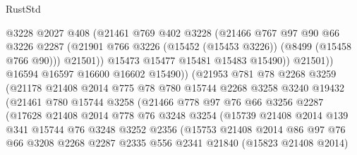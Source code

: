 \begin{lexlean}{RustStd}
\begin{coremodule}
                          @3228
                          @2027
                          @408
                          (@21461
                            @769
                            @402
                            @3228
                            (@21466
                              @767
                              @97
                              @90
                              @66
                              @3226
                              @2287
                              (@21901 @766 @3226 (@15452 (@15453 @3226)) (@8499 (@15458 @766 @90)))
                              @21501))
                          @15473
                          @15477
                          @15481
                          @15483
                          @15490))
                      @21501))
                  @16594
                  @16597
                  @16600
                  @16602
                  @15490))
              (@21953
                @781
                @78
                @2268
                @3259
                (@21178
                  @21408
                  @2014
                  @775
                  @78
                  @780
                  @15744
                  @2268
                  @3258
                  @3240
                  @19432
                  (@21461
                    @780
                    @15744
                    @3258
                    (@21466
                      @778
                      @97
                      @76
                      @66
                      @3256
                      @2287
                      (@17628
                        @21408
                        @2014
                        @778
                        @76
                        @3248
                        @3254
                        (@15739
                          @21408
                          @2014
                          @139
                          @341
                          @15744
                          @76
                          @3248
                          @3252
                          @2356
                          (@15753
                            @21408
                            @2014
                            @86
                            @97
                            @76
                            @66
                            @3208
                            @2268
                            @2287
                            @2335
                            @556
                            @2341
                            @21840
                            (@15823 @21408 @2014)

\end{coremodule}
\end{lexlean}
